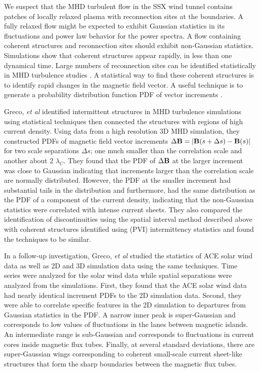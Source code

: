\documentclass[12pt]{iopart}
\begin{document}
We suspect that the MHD turbulent flow in the SSX wind tunnel contains patches of locally relaxed plasma with reconnection sites at the boundaries.  A fully relaxed flow might be expected to exhibit Gaussian statistics in its fluctuations and power law behavior for the power spectra.  A flow containing coherent structures and reconnection sites should exhibit non-Gaussian statistics.  Simulations show that coherent structures appear rapidly, in less than one dynamical time.  Large numbers of reconnection sites can be identified statistically in MHD turbulence studies \cite{Servidio09,Servidio10a}.  A statistical way to find these coherent structures is to identify rapid changes in the magnetic field vector.  A useful technique is to generate a probability distribution function PDF of vector increments \cite{Greco08,Greco09}.

Greco, {\it et al} \cite{Greco08} identified intermittent structures in MHD turbulence simulations using statistical techniques then connected the structures with regions of high current density.  Using data from a high resolution 3D MHD simulation, they constructed PDFs of magnetic field vector increments $\Delta {\bf B} = |{\bf B}(s + \Delta s) - {\bf B}(s)|$ for two scale separations $\Delta s$; one much smaller than the correlation scale and another about 2 $\lambda_C$.  They found that the PDF of $\Delta {\bf B}$ at the larger increment was close to Gaussian indicating that increments larger than the correlation scale are normally distributed.  However, the PDF at the smaller increment had substantial tails in the distribution and furthermore, had the same distribution as the PDF of a component of the current density, indicating that the non-Gaussian statistics were correlated with intense current sheets.  They also compared the identification of  discontinuities using the spatial interval method described above with coherent structures identified using (PVI) intermittency statistics and found the techniques to be similar.

In a follow-up investigation, Greco, {\it et al} \cite{Greco09} studied the statistics of ACE solar wind data as well as 2D and 3D simulation data using the same techniques.  Time series were analyzed for the solar wind data while spatial separations were analyzed from the simulations.  First, they found that the ACE solar wind data had nearly identical increment PDFs to the 2D simulation data.  Second, they were able to correlate specific features in the 2D simulation to departures from Gaussian statistics in the PDF.  A narrow inner peak is super-Gaussian and corresponds to low values of fluctuations in the lanes between magnetic islands.  An intermediate range is sub-Gaussian and corresponds to fluctuations in current cores inside magnetic flux tubes.  Finally, at several standard deviations, there are super-Gaussian wings corresponding to coherent small-scale current sheet-like structures that form the sharp boundaries between the magnetic flux tubes.
\end{document}
